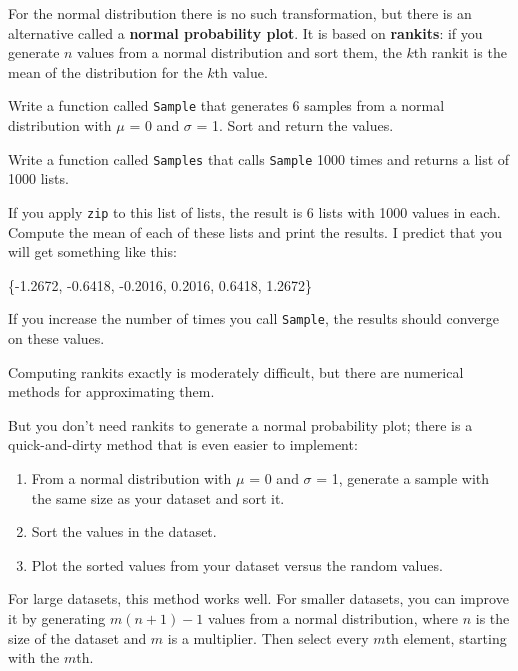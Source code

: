 \documentclass[12pt]{book}
\begin{document}
For the normal distribution there is no such transformation, but there
is an alternative called a {\bf normal probability plot}.  It is based
on {\bf rankits}: if you generate $n$ values from a normal
distribution and sort them, the $k$th rankit is the mean of the
distribution for the $k$th value.

\begin{exercise}
Write a function called {\tt Sample} that generates 6 samples from a
normal distribution with $\mu$ = 0 and $\sigma$ = 1.  Sort and return
the values.

Write a function called {\tt Samples} that calls {\tt Sample} 1000
times and returns a list of 1000 lists.

If you apply {\tt zip} to this list of lists, the result is 6 lists
with 1000 values in each.  Compute the mean of each of these lists
and print the results.  I predict that you will get something like
this:

\{-1.2672,   -0.6418,   -0.2016,   0.2016,   0.6418,   1.2672\}

If you increase the number of times you call {\tt Sample}, the
results should converge on these values.

\end{exercise}


Computing rankits exactly is moderately difficult, but there are
numerical methods for approximating them.

But you don't need rankits to generate a normal probability plot;
there is a quick-and-dirty method that is even easier to implement:

\begin{enumerate}

\item From a normal distribution with $\mu$ = 0 and $\sigma$ = 1,
generate a sample with the same size as your dataset and sort it.

\item Sort the values in the dataset.

\item Plot the sorted values from your dataset versus the random values.

\end{enumerate}

For large datasets, this method works well.
For smaller datasets, you can improve it by generating $m (n+1) - 1$
values from a normal distribution, where $n$ is the size of the
dataset and $m$ is a multiplier.  Then select every $m$th element,
starting with the $m$th.  
\end{document}
